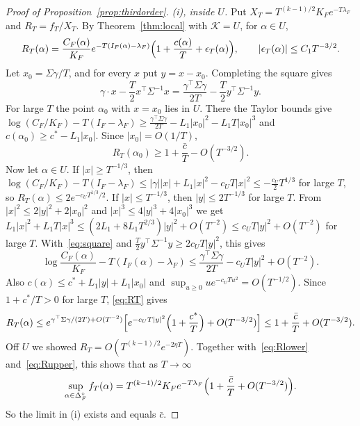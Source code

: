 \begin{proof}[Proof of Proposition~\ref{prop:thirdorder}]
\emph{(i), inside $U$.} Put $X_T=T^{(k-1)/2}K_Fe^{-T\lambda_F}$ and
$R_T=f_T/X_T$. By Theorem~\ref{thm:local} with $\mathcal K=U$, for
$\alpha\in U$,
\begin{equation}\label{eq:RT}
R_T(\alpha)=\frac{C_F(\alpha)}{K_F}e^{-T(I_F(\alpha)-\lambda_F)}
\Bigl(1+\frac{c(\alpha)}T+\epsilon_T(\alpha)\Bigr),\qquad
|\epsilon_T(\alpha)|\le C_1T^{-3/2}.
\end{equation}
Let $x_0=\Sigma\gamma/T$, and for every $x$ put $y=x-x_0$. Completing the
square gives
\begin{equation}\label{eq:square}
\gamma\cdot x-\frac T2x^\top\Sigma^{-1}x
=\frac{\gamma^\top\Sigma\gamma}{2T}-\frac T2y^\top\Sigma^{-1}y .
\end{equation}
For large $T$ the point $\alpha_0$ with $x=x_0$ lies in $U$. There the Taylor
bounds give
$\log(C_F/K_F)-T(I_F-\lambda_F)\ge\frac{\gamma^\top\Sigma\gamma}{2T}
-L_1|x_0|^2-L_1T|x_0|^3$ and $c(\alpha_0)\ge c^*-L_1|x_0|$. Since
$|x_0|=O(1/T)$,
\begin{equation}\label{eq:Rlower}
R_T(\alpha_0)\ge1+\frac{\bar c}T-O(T^{-3/2}).
\end{equation}
Now let $\alpha\in U$. If $|x|\ge T^{-1/3}$, then
$\log(C_F/K_F)-T(I_F-\lambda_F)\le|\gamma||x|+L_1|x|^2-c_UT|x|^2
\le-\frac{c_U}2T^{1/3}$ for large $T$, so $R_T(\alpha)\le2e^{-c_UT^{1/3}/2}$.
If $|x|\le T^{-1/3}$, then $|y|\le2T^{-1/3}$ for large $T$. From
$|x|^2\le2|y|^2+2|x_0|^2$ and $|x|^3\le4|y|^3+4|x_0|^3$ we get
$L_1|x|^2+L_1T|x|^3\le(2L_1+8L_1T^{2/3})|y|^2+O(T^{-2})\le c_UT|y|^2+O(T^{-2})$
for large $T$. With~\eqref{eq:square} and
$\frac T2y^\top\Sigma^{-1}y\ge2c_UT|y|^2$, this gives
\[
\log\frac{C_F(\alpha)}{K_F}-T(I_F(\alpha)-\lambda_F)
\le\frac{\gamma^\top\Sigma\gamma}{2T}-c_UT|y|^2+O(T^{-2}).
\]
Also $c(\alpha)\le c^*+L_1|y|+L_1|x_0|$ and
$\sup_{u\ge0}ue^{-c_UTu^2}=O(T^{-1/2})$. Since $1+c^*/T>0$ for large $T$,
\eqref{eq:RT} gives
\begin{equation}\label{eq:Rupper}
R_T(\alpha)\le e^{\gamma^\top\Sigma\gamma/(2T)+O(T^{-2})}
\Bigl[e^{-c_UT|y|^2}\Bigl(1+\frac{c^*}T\Bigr)+O(T^{-3/2})\Bigr]
\le1+\frac{\bar c}T+O(T^{-3/2}).
\end{equation}
Off $U$ we showed $R_T=O(T^{(k-1)/2}e^{-2\eta T})$. Together
with~\eqref{eq:Rlower} and~\eqref{eq:Rupper}, this shows that as
$T\to\infty$
\begin{equation}\label{eq:supf}
\sup_{\alpha\in\Delta_F^\circ}f_T(\alpha)=T^{(k-1)/2}K_Fe^{-T\lambda_F}
\Bigl(1+\frac{\bar c}T+O(T^{-3/2})\Bigr).
\end{equation}
So the limit in (i) exists and equals $\bar c$.


\end{proof}
